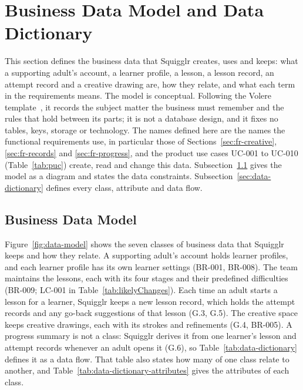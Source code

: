 \documentclass[12pt]{article}
\renewcommand{\_}{\textunderscore\allowbreak}%
\begin{document}
\section{Business Data Model and Data Dictionary}
\label{sec:data-model}

This section defines the business data that Squigglr creates, uses and keeps:
what a supporting adult's account, a learner profile, a lesson, a lesson record,
an attempt record and a creative drawing are, how they relate, and what each
term in the requirements means. The model is conceptual. Following the Volere
template~\cite{robertson2012volere}, it records the subject matter the business
must remember and the rules that hold between its parts; it is not a database
design, and it fixes no tables, keys, storage or technology. The names defined
here are the names the functional requirements use, in particular those of
Sections~\ref{sec:fr-creative}, \ref{sec:fr-records} and \ref{sec:fr-progress},
and the product use cases UC-001 to UC-010 (Table~\ref{tab:puc}) create, read
and change this data. Subsection~\ref{sec:bdm} gives the model as a diagram and
states the data constraints. Subsection~\ref{sec:data-dictionary} defines every
class, attribute and data flow.

\subsection{Business Data Model}
\label{sec:bdm}

Figure~\ref{fig:data-model} shows the seven classes of business data that
Squigglr keeps and how they relate. A supporting adult's account holds learner
profiles, and each learner profile has its own learner settings (BR-001,
BR-008). The team maintains the lessons, each with its four stages and their
predefined difficulties (BR-009; LC-001 in Table~\ref{tab:likelyChanges}). Each
time an adult starts a lesson for a learner, Squigglr keeps a new lesson record,
which holds the attempt records and any go-back suggestions of that lesson (G.3,
G.5). The creative space keeps creative drawings, each with its strokes and
refinements (G.4, BR-005). A progress summary is not a class: Squigglr derives
it from one learner's lesson and attempt records whenever an adult opens it
(G.6), so Table~\ref{tab:data-dictionary} defines it as a data flow. That table
also states how many of one class relate to another, and
Table~\ref{tab:data-dictionary-attributes} gives the attributes of each class.
\end{document}
